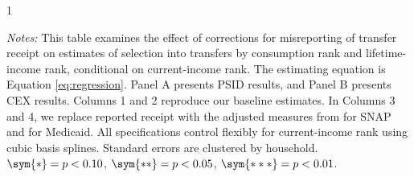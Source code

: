 \begin{table}[t!]
\begin{spacing}{1}
\begin{tablenotes}
                          \item \footnotesize \textit{Notes:} This table examines the effect of corrections for misreporting of transfer receipt on estimates of selection into transfers by consumption rank and lifetime-income rank, conditional on current-income rank. The estimating equation is Equation \ref{eq:regression}. Panel A presents PSID results, and Panel B presents CEX results. Columns 1 and 2 reproduce our baseline estimates. In Columns 3 and 4, we replace reported receipt with the adjusted measures from  for SNAP and  for Medicaid. All specifications control flexibly for current-income rank using cubic basis splines.  Standard errors are clustered by household. $\sym{*} = p < 0.10$, $\sym{**} = p < 0.05$, $\sym{***} = p < 0.01$.
                          \end{tablenotes}
                           \end{spacing}
                    \end{table}                
